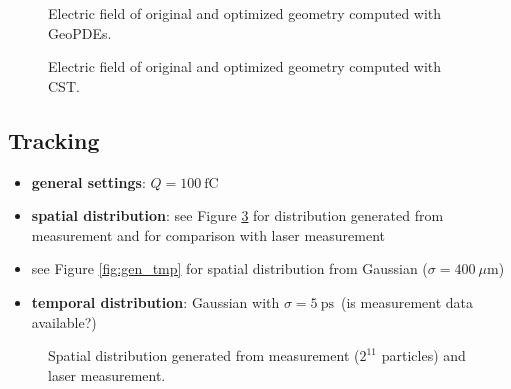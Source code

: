 \begin{center}
\begin{figure}[H]
    \begin{subfigure}{0.45\textwidth}
    \end{subfigure}
    \begin{subfigure}{0.45\textwidth}
    \end{subfigure}
    \caption{Electric field of original and optimized geometry computed with GeoPDEs.}
    \label{fig:E_iga}
\end{figure}
\end{center}

\begin{center}
\begin{figure}[H]
    \begin{subfigure}{0.45\textwidth}
    \end{subfigure}
    \begin{subfigure}{0.45\textwidth}
    \end{subfigure}
    \caption{Electric field of original and optimized geometry computed with CST.}
    \label{fig:E_cst}
\end{figure}
\end{center}

\newpage

\subsection{Tracking}
\begin{itemize}
   \item \textbf{general settings}: $Q=100\ \mathrm{fC}$
   \item \textbf{spatial distribution}: see Figure \ref{fig:gen_sp} for distribution generated from measurement and for comparison with laser measurement
   \item see Figure \ref{fig:gen_tmp} for spatial distribution from Gaussian ($\sigma=400\ \mu \mathrm{m}$)
   \item \textbf{temporal distribution}: Gaussian with $\sigma=5\ \mathrm{ps}$\ (is measurement data available?)
\end{itemize}

\begin{center}
\begin{figure}[H]
   \begin{subfigure}{0.4\textwidth}
      
   \end{subfigure}
   \qquad \qquad \qquad
   \begin{subfigure}{0.5\textwidth}
   \end{subfigure}
   \caption{Spatial distribution generated from measurement ($2^{11}$ particles) and laser measurement.}
   \label{fig:gen_sp}
\end{figure}
\end{center}

